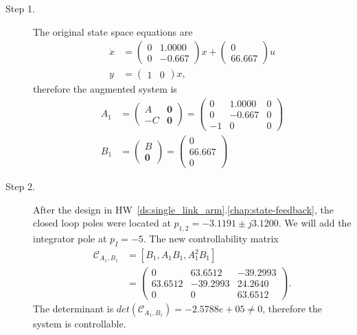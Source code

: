 \begin{description}
\item[Step 1.]
The original state space equations are 
\begin{align*}
\dot{x} &= \begin{pmatrix} 0 &   1.0000 \\ 0 &  -0.667 \end{pmatrix}x + \begin{pmatrix} 0 \\ 66.667 \end{pmatrix} u \\
y &= \begin{pmatrix}1 & 0 \end{pmatrix}x,
\end{align*}
therefore the augmented system is
\begin{align*}
A_1 &= \begin{pmatrix} A & \mathbf{0} \\ -C & \mathbf{0} \end{pmatrix} = \begin{pmatrix} 0 &   1.0000 & 0 \\ 0 &  -0.667 & 0 \\ -1 & 0 & 0 \end{pmatrix} \\
B_1 &= \begin{pmatrix} B \\ \mathbf{0} \end{pmatrix} = \begin{pmatrix} 0 \\ 66.667 \\ 0 \end{pmatrix}
\end{align*}

\item[Step 2.] 
After the design in HW~\ref{ds:single_link_arm}.\ref{chap:state-feedback}, the closed loop poles were located at $p_{1,2} = -3.1191 \pm j 3.1200$.  We will add the integrator pole at $p_I=-5$.
The new controllability matrix
\begin{align*}
\mathcal{C}_{A_1,B_1} &= [B_1, A_1B_1, A_1^2B_1] \\ &= \begin{pmatrix} 
         0 &   63.6512 & -39.2993 \\
   63.6512 & -39.2993  & 24.2640 \\
         0 &        0  & 63.6512
\end{pmatrix}.
\end{align*}
The determinant is $det(\mathcal{C}_{A_1,B_1})=-2.5788e+05\neq 0$, therefore the system is controllable.  


\end{description}
